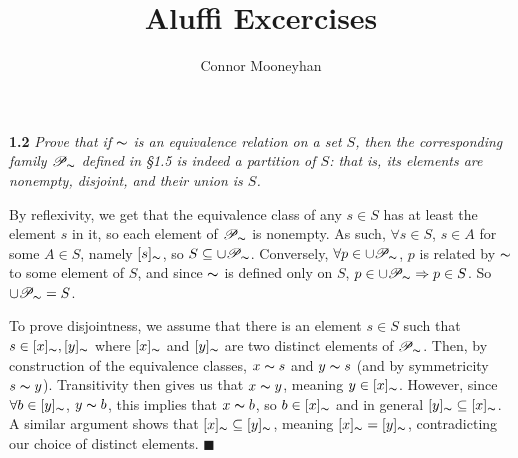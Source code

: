\documentclass[12pt, letterpaper]{article}
\title{Aluffi Excercises}
\author{Connor Mooneyhan}
\begin{document}
\maketitle

\textbf{1.2} \textit{Prove that if $\thicksim$ is an equivalence relation on a set $S$, then the corresponding family $\mathscr{P}_\thicksim$ defined in \S 1.5 is indeed a partition of $S$: that is, its elements are nonempty, disjoint, and their union is $S$.}

By reflexivity, we get that the equivalence class of any $s \in S$ has at least the element $s$ in it, so each element of $\mathscr{P}_\thicksim$ is nonempty. As such, $\forall s \in S$, $s \in A$ for some $A \in S$, namely $[s]_\thicksim$, so $S \subseteq \cup \mathscr{P}_\thicksim$. Conversely, $\forall p \in \cup \mathscr{P}_\thicksim$, $p$ is related by $\thicksim$ to some element of $S$, and since $\thicksim$ is defined only on $S$, $p \in \cup \mathscr{P}_\thicksim \Rightarrow p \in S$. So $\cup \mathscr{P}_\thicksim = S$.

To prove disjointness, we assume that there is an element $s \in S$ such that $s \in [x]_\thicksim , [y]_\thicksim$ where $[x]_\thicksim$ and $[y]_\thicksim$ are two distinct elements of $\mathscr{P}_\thicksim$. Then, by construction of the equivalence classes, $x \thicksim s$ and $y \thicksim s$ (and by symmetricity $s \thicksim y$). Transitivity then gives us that $x \thicksim y$, meaning $y \in [x]_\thicksim$. However, since $\forall b \in [y]_\thicksim$, $y \thicksim b$, this implies that $x \thicksim b$, so $b \in [x]_\thicksim$ and in general $[y]_\thicksim \subseteq [x]_\thicksim$. A similar argument shows that $[x]_\thicksim \subseteq [y]_\thicksim$, meaning $[x]_\thicksim = [y]_\thicksim$, contradicting our choice of distinct elements. $\blacksquare$
\end{document}
